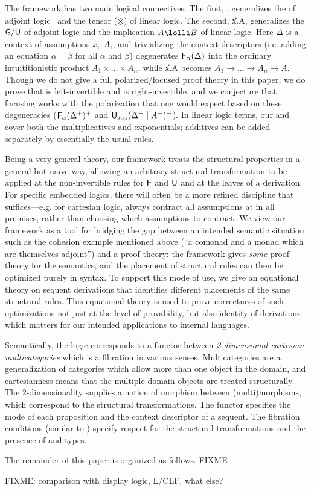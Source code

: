 The framework has two main logical connectives.  The first,
\F{\alpha}{\Delta}, generalizes the  of adjoint
logic~\citep{bentonwadler96adjoint,reed09adjoint} and the tensor
($\otimes$) of linear logic.  The second, \U{x.\alpha}{\Delta}{A},
generalizes the $\mathsf{G}/\mathsf{U}$ of adjoint logic and the implication
$A \lolli B$ of linear logic.  Here $\Delta$ is a context of assumptions
$x_i:A_i$, and trivializing the context descriptors (i.e. adding an
equation $\alpha = \beta$ for all $\alpha$ and $\beta$) degenerates
$\mathsf{F}_{\alpha}(\Delta)$ into the ordinary intuititionistic product $A_1
\times \ldots \times A_n$, while \U{x.\alpha}{\Delta}{A} becomes $A_1
\to \ldots \to A_n \to A$.  Though we do not give a full
polarized/focused proof theory in this paper, we do prove that 
is left-invertible and  is right-invertible, and we conjecture
that focusing works with the polarization that one would expect based on
these degeneracies ($\mathsf{F}_{\alpha}(\Delta^{\mathord{+}})^{\mathord{+}}$ and
$\mathsf{U}_{x.\alpha}(\Delta^{\mathord{+}} \mid A^{\mathord{-}})^{\mathord{-}}$).
In linear logic terms, our  and  cover both the
multiplicatives and exponentials; additives can be added separately by
essentially the usual rules.

Being a very general theory, our framework treats the structural
properties in a general but na\"ive way, allowing an arbitrary
structural transformation to be applied at the non-invertible rules for
$\mathsf{F}$ and $\mathsf{U}$ and at the leaves of a derivation.  For specific
embedded logics, there will often be a more refined discipline that
suffices---e.g. for cartesian logic, always contract all assumptions at
in all premises, rather than choosing which assumptions to contract.  We
view our framework as a tool for bridging the gap between an intended
semantic situation such as the cohesion example mentioned above (``a
comonad and a monad which are themselves adjoint'') and a proof theory:
the framework gives \emph{some} proof theory for the semantics, and the
placement of structural rules can then be optimized purely in syntax.
To support this mode of use, we give an equational theory on sequent
derivations that identifies different placements of the same structural
rules.  This equational theory is used to prove correctness of such
optimizations not just at the level of provability, but also identity of
derivations---which matters for our intended applications to internal
languages.

Semantically, the logic corresponds to a functor between
\emph{2-dimensional cartesian multicategories} which is a fibration in
various senses.  Multicategories are a generalization of categories
which allow more than one object in the domain, and cartesianness means
that the multiple domain objects are treated structurally.  The
2-dimensionality supplies a notion of morphism between (multi)morphisms,
which correspond to the structural transformations.  The functor
specifies the mode of each proposition and the context descriptor of a
sequent.  The fibration conditions (similar to \citep{hermida,hormann})
specify respect for the structural transformations and the presence of
 and  types.

The remainder of this paper is organized as follows.  FIXME

FIXME: comparison with display logic, L/CLF, what else?  

